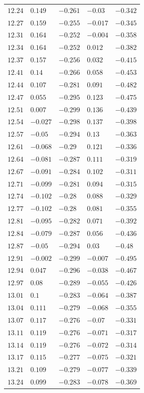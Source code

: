 \begin{table}[h]
\begin{tabular}{rllll}
$12.24$&$0.149$&$-0.261$&$-0.03$&$-0.342$\\
$12.27$&$0.159$&$-0.255$&$-0.017$&$-0.345$\\
$12.31$&$0.164$&$-0.252$&$-0.004$&$-0.358$\\
$12.34$&$0.164$&$-0.252$&$0.012$&$-0.382$\\
$12.37$&$0.157$&$-0.256$&$0.032$&$-0.415$\\
$12.41$&$0.14$&$-0.266$&$0.058$&$-0.453$\\
$12.44$&$0.107$&$-0.281$&$0.091$&$-0.482$\\
$12.47$&$0.055$&$-0.295$&$0.123$&$-0.475$\\
$12.51$&$0.007$&$-0.299$&$0.136$&$-0.439$\\
$12.54$&$-0.027$&$-0.298$&$0.137$&$-0.398$\\
$12.57$&$-0.05$&$-0.294$&$0.13$&$-0.363$\\
$12.61$&$-0.068$&$-0.29$&$0.121$&$-0.336$\\
$12.64$&$-0.081$&$-0.287$&$0.111$&$-0.319$\\
$12.67$&$-0.091$&$-0.284$&$0.102$&$-0.311$\\
$12.71$&$-0.099$&$-0.281$&$0.094$&$-0.315$\\
$12.74$&$-0.102$&$-0.28$&$0.088$&$-0.329$\\
$12.77$&$-0.102$&$-0.28$&$0.081$&$-0.355$\\
$12.81$&$-0.095$&$-0.282$&$0.071$&$-0.392$\\
$12.84$&$-0.079$&$-0.287$&$0.056$&$-0.436$\\
$12.87$&$-0.05$&$-0.294$&$0.03$&$-0.48$\\
$12.91$&$-0.002$&$-0.299$&$-0.007$&$-0.495$\\
$12.94$&$0.047$&$-0.296$&$-0.038$&$-0.467$\\
$12.97$&$0.08$&$-0.289$&$-0.055$&$-0.426$\\
$13.01$&$0.1$&$-0.283$&$-0.064$&$-0.387$\\
$13.04$&$0.111$&$-0.279$&$-0.068$&$-0.355$\\
$13.07$&$0.117$&$-0.276$&$-0.07$&$-0.331$\\
$13.11$&$0.119$&$-0.276$&$-0.071$&$-0.317$\\
$13.14$&$0.119$&$-0.276$&$-0.072$&$-0.314$\\
$13.17$&$0.115$&$-0.277$&$-0.075$&$-0.321$\\
$13.21$&$0.109$&$-0.279$&$-0.077$&$-0.339$\\
$13.24$&$0.099$&$-0.283$&$-0.078$&$-0.369$\\

\end{tabular}
\end{table}
